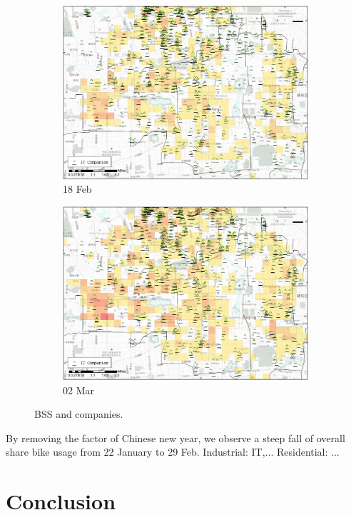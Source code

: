 \documentclass[preprints,ijgi,submit,moreauthors]{Definitions/mdpi}
\begin{document}
\begin{figure}[H]
\begin{subfigure}{.23\textwidth}
        \includegraphics[width=\textwidth]{Figures/Relation_with_POIs/POI_compD2020_02_18.eps}
        \caption{18 Feb}
    \end{subfigure}
        \begin{subfigure}{.23\textwidth}
        \includegraphics[width=\textwidth]{Figures/Relation_with_POIs/POI_compD2020_03_02.eps}
        \caption{02 Mar}
    \end{subfigure}
    \caption{BSS and companies.}
    \label{fig:BSS_companies}
\end{figure}

By removing the factor of Chinese new year, we observe a steep fall of overall share bike usage from 22 January to 29 Feb.
Industrial: IT,...
Residential: ...


\section{Conclusion}
\end{document}
